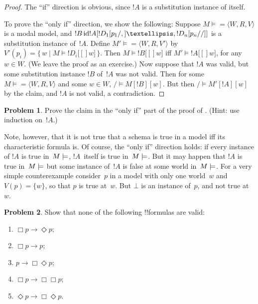 \documentclass[10pt,a4paper]{article}
\makeatletter
\theoremstyle{plain}
\theoremstyle{definition}
\newtheorem{prob}{Problem}[section]
\theoremstyle{remark}
\newcommand{\olref}{\@ifnextchar[{\olref@i}{\olref@final}}
\def\olref@i[#1]{\@ifnextchar[{\olref@ii}{\olref@final}}
\def\olref@ii[#1]{\@ifnextchar[{\olref@iii}{\olref@final}}
\def\olref@iii[#1]{\olref@final}
\def\olref@final#1{\ref{#1}}
\providecommand{\lif}{\mathbin{\rightarrow}}
\providecommand{\lfalse}{\bot}
\providecommand{\mSat}[3]{\ensuremath{#1 \models #2[#3]}}
\providecommand{\mModel}[2]{\ensuremath{#1 \models #2}}
\providecommand{\tuple}[1]{\langle #1 \rangle}
\providecommand{\Setabs}[2]{\{\, #1 \mid #2 \,\}}
\providecommand{\Ax}{\mathrm{Ax}}
\providecommand{\SSubst}[3]{#1[#2/#3]}
\providecommand{\subst}[3]{#1[#2/#3]}
\providecommand{\ident}{\operatorname{id}}
\makeatother
\begin{document}
\begin{proof}
  The ``if'' direction is obvious, since $!A$ is a substitution
  instance of itself.

  To prove the ``only if'' direction, we show the following: Suppose
  $\mModel{M} = \tuple{W, R, V}$ is a modal model, and $!B \ident
  \SSubst{!A}{\subst{!D_1}{p_1},\dots,\subst{!D_n}{p_n}}$ is a
  substitution instance of~$!A$. Define $\mModel{M'} = \tuple{W, R,
    V'}$ by $V'(p_i) = \Setabs{w}{\mSat{M}{!D_i}[w]}$.  Then
  $\mSat{M}{!B}[w]$ iff $\mSat{M'}{!A}[w]$, for any~$w \in W$. (We
  leave the proof as an exercise.) Now suppose that $!A$ was valid,
  but some substitution instance $!B$ of~$!A$ was not valid. Then for
  some $\mModel{M} = \tuple{W, R, V}$ and some $w \in W$,
  $\mSat/{M}{!B}[w]$. But then $\mSat/{M'}{!A}[w]$ by the claim, and
  $!A$ is not valid, a contradiction.
\end{proof}

\begin{prob}
  Prove the claim in the ``only if'' part of the proof of
  \olref[nml][syn][sch]{prop:valid-instances}. (Hint: use induction
  on~$!A$.)
\end{prob}

Note, however, that it is not true that a schema is true in a model
iff its characteristic formula is. Of course, the ``only if''
direction holds: if every instance of $!A$ is true in~$\mModel{M}$,
$!A$~itself is true in~$\mModel{M}$. But it may happen that $!A$ is
true in~$\mModel{M}$ but some instance of~$!A$ is false at some world
in~$\mModel{M}$. For a very simple counterexample consider~$p$ in a
model with only one world~$w$ and $V(p) = \{w\}$, so that $p$ is true
at~$w$. But $\lfalse$ is an instance of~$p$, and not true at~$w$.

\begin{prob}
  Show that none of the following !!{formula}s are valid:
  \begin{enumerate}
    \item[\Ax{D}:] \quad $\Box p \lif \Diamond p$;
    \item[\Ax{T}:] \quad $\Box p \lif p$;
    \item[\Ax{B}:] \quad $p \lif \Box\Diamond p$;
    \item[\Ax{4}:] \quad $\Box p \lif \Box \Box p$;
    \item[\Ax{5}:] \quad $\Diamond p \lif \Box \Diamond
      p$.
  \end{enumerate}
\end{prob}
\end{document}

